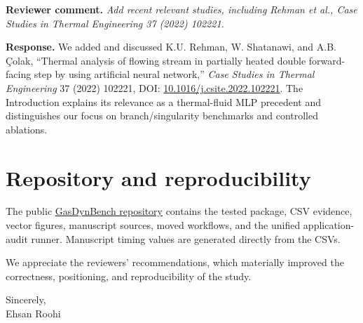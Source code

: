 \documentclass[11pt]{article}
\newcommand{\comment}[1]{\par\medskip\noindent\textbf{Reviewer comment.} \emph{#1}\par}
\newcommand{\response}[1]{\par\noindent\textcolor{responseblue}{\textbf{Response.} #1}\par\medskip}
\begin{document}
\comment{Add recent relevant studies, including Rehman et al., Case Studies in Thermal Engineering 37 (2022) 102221.}
\response{We added and discussed K.U. Rehman, W. Shatanawi, and A.B. \c{C}olak, ``Thermal analysis of flowing stream in partially heated double forward-facing step by using artificial neural network,'' \emph{Case Studies in Thermal Engineering} 37 (2022) 102221, DOI: \href{https://doi.org/10.1016/j.csite.2022.102221}{10.1016/j.csite.2022.102221}. The Introduction explains its relevance as a thermal-fluid MLP precedent and distinguishes our focus on branch/singularity benchmarks and controlled ablations.}

\section*{Repository and reproducibility}
The public \href{https://github.com/Ehsan-Roohi/GasDynamicsSciML}{GasDynBench repository} contains the tested package, CSV evidence, vector figures, manuscript sources, moved workflows, and the unified application-audit runner. Manuscript timing values are generated directly from the CSVs.

We appreciate the reviewers' recommendations, which materially improved the correctness, positioning, and reproducibility of the study.

Sincerely,\\
Ehsan Roohi
\end{document}
